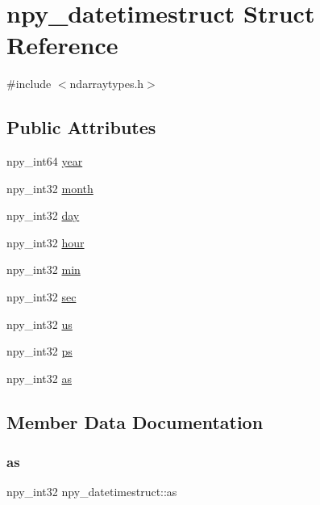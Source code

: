 \hypertarget{structnpy__datetimestruct}{}\section{npy\+\_\+datetimestruct Struct Reference}
\label{structnpy__datetimestruct}


{\ttfamily \#include $<$ndarraytypes.\+h$>$}

\subsection*{Public Attributes}
\begin{DoxyCompactItemize}
\item 
npy\+\_\+int64 \hyperlink{structnpy__datetimestruct_af6d1283c07f9b8e459ebb152b45575b5}{year}
\item 
npy\+\_\+int32 \hyperlink{structnpy__datetimestruct_a791ad6592744bff63903a49ff759a35f}{month}
\item 
npy\+\_\+int32 \hyperlink{structnpy__datetimestruct_a8f943a5812cc3848e89c4efdb3a33621}{day}
\item 
npy\+\_\+int32 \hyperlink{structnpy__datetimestruct_ae30fd8fa505ae013c161cde32f2536f8}{hour}
\item 
npy\+\_\+int32 \hyperlink{structnpy__datetimestruct_a743a85580f2ce0b8f3e328324c068f7e}{min}
\item 
npy\+\_\+int32 \hyperlink{structnpy__datetimestruct_a0edb35e46eba4fdeb241c980933474b9}{sec}
\item 
npy\+\_\+int32 \hyperlink{structnpy__datetimestruct_a41baa454b6ef074faacb2ce2dc302a8f}{us}
\item 
npy\+\_\+int32 \hyperlink{structnpy__datetimestruct_a9f73efdf6eb26ba47f7c3e1910d3ca4e}{ps}
\item 
npy\+\_\+int32 \hyperlink{structnpy__datetimestruct_a19866d149795e7489475ca370c87c01d}{as}
\end{DoxyCompactItemize}


\subsection{Member Data Documentation}
\mbox{\label{structnpy__datetimestruct_a19866d149795e7489475ca370c87c01d}} 
\subsubsection{\texorpdfstring{as}{as}}
{\footnotesize\ttfamily npy\+\_\+int32 npy\+\_\+datetimestruct\+::as}

